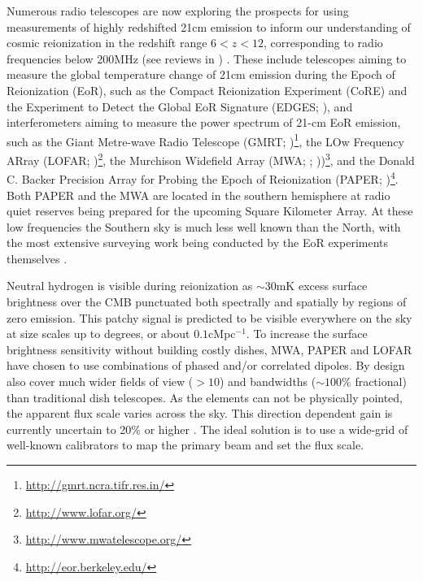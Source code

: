 \documentclass[preprint]{aastex}
\begin{document}
Numerous radio telescopes are now exploring the prospects for using
measurements of highly redshifted 21cm emission to inform our understanding of
cosmic reionization in the redshift range $6< z<12$, corresponding to radio
frequencies below 200MHz (see reviews in
\citet{Furlanetto:2006p2267,Morales:2010p8093,Pritchard:2012p9555}) .  These
include telescopes aiming to measure the global temperature change of 21cm
emission during the Epoch of Reionization (EoR), such as the Compact
Reionization Experiment (CoRE) and the Experiment to Detect the Global EoR
Signature (EDGES; \citealt{Bowman:2010p8546}), and interferometers aiming to
measure the power spectrum of 21-cm EoR emission, such as the Giant Metre-wave
Radio Telescope (GMRT;
\citealt{Paciga:2011p9470,Paciga:2013p9627})\footnote{\url{http://gmrt.ncra.tifr.res.in/}},
the LOw Frequency ARray (LOFAR;
\citealt{Yatawatta:2013p9699})\footnote{\url{http://www.lofar.org/}}, the
Murchison Widefield Array (MWA;  \citealt{Bowman:2012p9138};
\citealt{Tingay:2013p9022}))\footnote{\url{http://www.mwatelescope.org/}}, and
the Donald C. Backer Precision Array for Probing the Epoch of Reionization
(PAPER; \citealt{Parsons:2010p6757})\footnote{\url{http://eor.berkeley.edu/}}.
Both PAPER and the MWA are located in the southern hemisphere at radio quiet
reserves being prepared for the upcoming Square Kilometer Array.  At these low
frequencies the Southern sky is much less well known than the North, with the
most extensive surveying work being conducted  by the EoR experiments
themselves \citep{Jacobs:2011p8438,Williams:2012p8768}.
  
Neutral hydrogen is visible during reionization as $\sim$30mK excess surface
brightness over the CMB punctuated both spectrally and spatially by regions of
zero emission.  This patchy signal is predicted to be visible everywhere on the
sky at size scales up to degrees, or about $0.1$cMpc$^{-1}$.   To increase the
surface brightness sensitivity without building costly dishes, MWA, PAPER and
LOFAR have chosen to use combinations of phased and/or correlated dipoles. By
design also cover much wider fields of view ($>10$\arcdeg) and bandwidths
($\sim 100$\% fractional) than traditional dish telescopes.   As the elements
can not be physically pointed, the apparent flux scale varies across the sky.
This direction dependent gain is currently uncertain to 20\% or higher
\citep{Jacobs:2013p9713}.  The ideal solution is to use a wide-grid of
well-known calibrators to map the primary beam and set the flux scale.  

\end{document}
